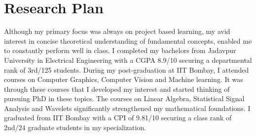 \documentclass{article}
\begin{document}
	
	\vspace*{-0.25cm}
	\section{Research Plan}
	\vspace*{-0.25cm}
	Although my primary focus was always on project based learning, my avid interest in concise theoretical understanding of fundamental concepts, enabled me to constantly perform well in class. I completed my bachelors from Jadavpur University in Electrical Engineering with a CGPA 8.9/10 securing a departmental rank of 3rd/125 students. During my post-graduation at IIT Bombay, I attended courses on Computer Graphics, Computer Vision and Machine learning. It was through these courses that I developed my interest and started thinking of pursuing PhD in these topics. The courses on Linear Algebra, Statistical Signal Analysis and Wavelets significantly strengthened my mathematical foundations. I graduated from IIT Bombay with a CPI of 9.81/10 securing a class rank of 2nd/24 graduate students in my specialization.

	
\end{document}
